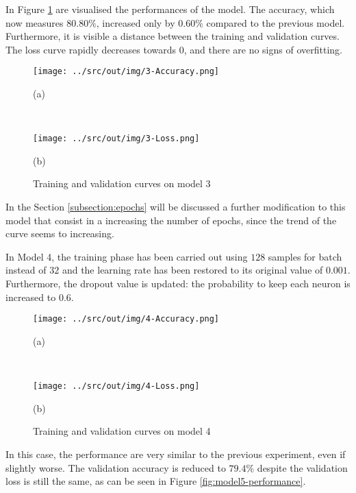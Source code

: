 \documentclass[a4paper,12pt]{article} %
\begin{document}
	In Figure \ref{fig:model3-performance} are visualised the performances of 
	the model. The accuracy, which now measures $80.80\%$, increased only by 
	$0.60\%$ compared to the previous model. Furthermore, it is visible a 
	distance between the training and validation curves. 
	The loss curve rapidly decreases towards $0$, and there are no signs of 
	overfitting.

	\begin{figure}[htb]
		\begin{minipage}[c]{.49\textwidth}
			\centering
			\texttt{[image: ../src/out/img/3-Accuracy.png]}
			\caption*{(a)}
		\end{minipage}
		~
		\begin{minipage}[c]{.49\textwidth}
			\centering
			\texttt{[image: ../src/out/img/3-Loss.png]}
			\caption*{(b)}
		\end{minipage}
		\caption{Training and validation curves on model 3}
		\label{fig:model3-performance}
	\end{figure}
		
	In the Section \ref{subsection:epochs} will be discussed a further 
	modification to this model that consist in a increasing the number of 
	epochs, since the trend of the curve seems to increasing.
	\newline 
	
	In Model 4, the training phase has been carried out using $128$ samples 
	for batch instead of $32$ and the learning rate has been restored to its 
	original value of $0.001$. 
	Furthermore, the dropout value is updated: the probability to keep each 
	neuron is increased to $0.6$. 
		
	\begin{figure}[htb]
		\begin{minipage}[c]{.49\textwidth}
			\centering
			\texttt{[image: ../src/out/img/4-Accuracy.png]}
			\caption*{(a)}
		\end{minipage}
		~
		\begin{minipage}[c]{.49\textwidth}
			\centering
			\texttt{[image: ../src/out/img/4-Loss.png]}
			\caption*{(b)}
		\end{minipage}
		\caption{Training and validation curves on model 4}
		\label{fig:model4-performance}
	\end{figure}

	In this case, the performance are very similar to the previous experiment, 
	even if slightly worse. The validation accuracy is reduced to 
	$79.4\%$ despite the validation loss is still the same, as can be seen in 
	Figure \ref*{fig:model5-performance}.
	\newline
	
\end{document}
